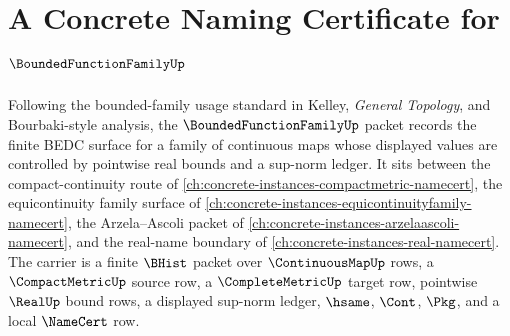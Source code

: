 \chapter{A Concrete Naming Certificate for $\BoundedFunctionFamilyUp$}
\label{ch:concrete-instances-bounded-function-family-namecert}

Following the bounded-family usage standard in Kelley, \emph{General Topology}, and Bourbaki-style analysis, the $\BoundedFunctionFamilyUp$ packet records the finite BEDC surface for a family of continuous maps whose displayed values are controlled by pointwise real bounds and a sup-norm ledger. It sits between the compact-continuity route of \autoref{ch:concrete-instances-compactmetric-namecert}, the equicontinuity family surface of \autoref{ch:concrete-instances-equicontinuityfamily-namecert}, the Arzela--Ascoli packet of \autoref{ch:concrete-instances-arzelaascoli-namecert}, and the real-name boundary of \autoref{ch:concrete-instances-real-namecert}. The carrier is a finite $\BHist$ packet over $\ContinuousMapUp$ rows, a $\CompactMetricUp$ source row, a $\CompleteMetricUp$ target row, pointwise $\RealUp$ bound rows, a displayed sup-norm ledger, $\hsame$, $\Cont$, $\Pkg$, and a local $\NameCert$ row.

